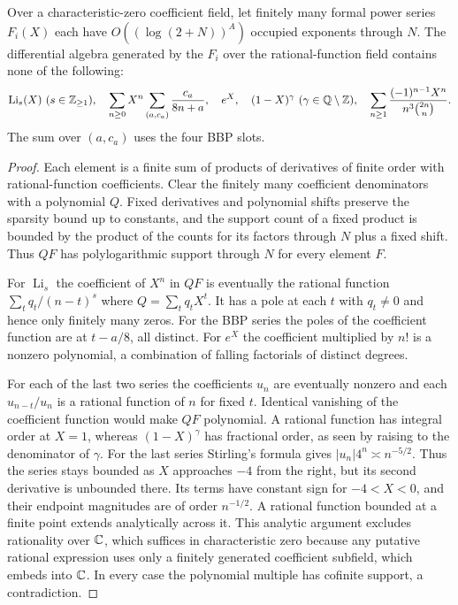 \documentclass[11pt]{article}
\begin{document}
\begin{proposition}\label{prop:functional}
Over a characteristic-zero coefficient field, let finitely many formal power series $F_i(X)$ each have $O((\log(2+N))^A)$ occupied exponents through $N$. The differential algebra generated by the $F_i$ over the rational-function field contains none of the following:
\[
 \operatorname{Li}_s(X)\ (s\in\mathbb Z_{\ge1}),\quad
 \sum_{n\ge0}X^n\sum_{(a,c_a)}\frac{c_a}{8n+a},\quad
 e^X,\quad (1-X)^\gamma\ (\gamma\in\mathbb Q\setminus\mathbb Z),\quad
 \sum_{n\ge1}\frac{(-1)^{n-1}X^n}{n^3\binom{2n}{n}}.
\]
The sum over $(a,c_a)$ uses the four BBP slots.
\end{proposition}
\begin{proof}
Each element is a finite sum of products of derivatives of finite order with rational-function coefficients. Clear the finitely many coefficient denominators with a polynomial $Q$. Fixed derivatives and polynomial shifts preserve the sparsity bound up to constants, and the support count of a fixed product is bounded by the product of the counts for its factors through $N$ plus a fixed shift. Thus $QF$ has polylogarithmic support through $N$ for every element $F$.

For $\operatorname{Li}_s$ the coefficient of $X^n$ in $QF$ is eventually the rational function $\sum_t q_t/(n-t)^s$ where $Q=\sum_t q_tX^t$. It has a pole at each $t$ with $q_t\ne0$ and hence only finitely many zeros. For the BBP series the poles of the coefficient function are at $t-a/8$, all distinct. For $e^X$ the coefficient multiplied by $n!$ is a nonzero polynomial, a combination of falling factorials of distinct degrees.

For each of the last two series the coefficients $u_n$ are eventually nonzero and each $u_{n-t}/u_n$ is a rational function of $n$ for fixed $t$. Identical vanishing of the coefficient function would make $QF$ polynomial. A rational function has integral order at $X=1$, whereas $(1-X)^\gamma$ has fractional order, as seen by raising to the denominator of $\gamma$. For the last series Stirling's formula gives $|u_n|4^n\asymp n^{-5/2}$. Thus the series stays bounded as $X$ approaches $-4$ from the right, but its second derivative is unbounded there. Its terms have constant sign for $-4<X<0$, and their endpoint magnitudes are of order $n^{-1/2}$. A rational function bounded at a finite point extends analytically across it. This analytic argument excludes rationality over $\mathbb C$, which suffices in characteristic zero because any putative rational expression uses only a finitely generated coefficient subfield, which embeds into $\mathbb C$. In every case the polynomial multiple has cofinite support, a contradiction.
\end{proof}
\end{document}

